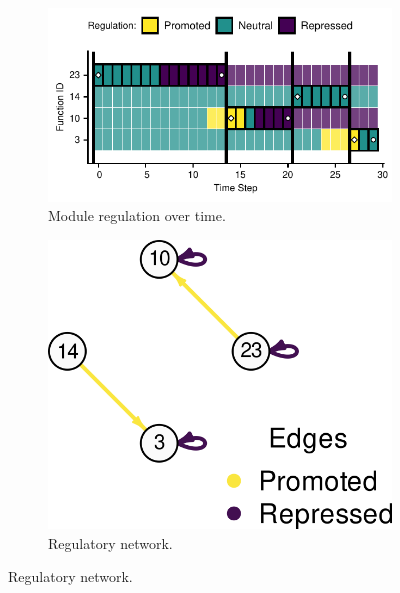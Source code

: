 
\begin{figure}[ht]
\centering

\begin{subfigure}[b]{0.55\textwidth}
    \centering
    \includegraphics[width=\linewidth]{chapters/05-tag-based-genetic-regulation/media/signal-counting-networks/case-study-trace-id-20203-regulator-state-horizontal.pdf}
    \caption{\small Module regulation over time.}
    \label{chapter:tag-based-regulation:subfig:rst-exec-trace}
\end{subfigure}%
\hfill
\begin{subfigure}[b]{0.3\textwidth}
    \centering
    \includegraphics[width=\linewidth]{chapters/05-tag-based-genetic-regulation/media/signal-counting-networks/case-study-id-20203-network.png}
    \caption{\small Regulatory network.}
    \label{chapter:tag-based-regulation:subfig:rst-reg-network}
\end{subfigure}%



\end{figure}
